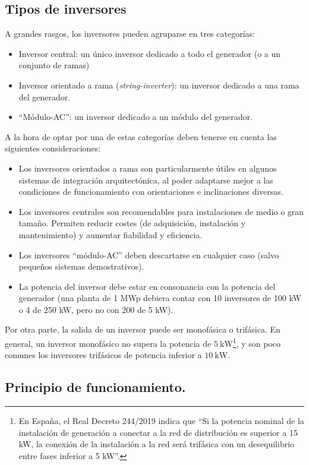 \subsection{Tipos de inversores}

A grandes rasgos, los inversores pueden agruparse en tres categorías:
\begin{itemize}
\item Inversor central: un único inversor dedicado a todo el generador (o
a un conjunto de ramas)
\item Inversor orientado a rama (\emph{string-inverter}): un inversor dedicado
a una rama del generador.
\item {}``Módulo-AC'': un inversor dedicado a un módulo del generador.
\end{itemize}
A la hora de optar por una de estas categorías deben tenerse en cuenta
las siguientes consideraciones:
\begin{itemize}
\item Los inversores orientados a rama son particularmente útiles en algunos
sistemas de integración arquitectónica, al poder adaptarse mejor a
las condiciones de funcionamiento con orientaciones e inclinaciones
diversas.
\item Los inversores centrales son recomendables para instalaciones de medio
o gran tamaño. Permiten reducir costes (de adquisición, instalación
y mantenimiento) y aumentar fiabilidad y eficiencia.
\item Los inversores \textquotedblleft{}módulo-AC\textquotedblright{} deben
descartarse en cualquier caso (salvo pequeños sistemas demostrativos).
\item La potencia del inversor debe estar en consonancia con la potencia
del generador (una planta de 1 MWp debiera contar con 10 inversores
de 100 kW o 4 de 250 kW, pero no con 200 de 5 kW).
\end{itemize}

Por otra parte, la salida de un inversor puede ser monofásica o
trifásica. En general, un inversor monofásico no supera la potencia de
$\SI{5}{\kilo\watt}$\footnote{En España, el Real Decreto 244/2019
  indica que ``Si la potencia nominal de la instalación de generación
  a conectar a la red de distribución es superior a 15 kW, la conexión
  de la instalación a la red será trifásica con un desequilibrio entre
  fases inferior a 5 kW''.}, y son poco comunes los inversores
trifásicos de potencia inferior a $\SI{10}{\kilo\watt}$.

\subsection{Principio de funcionamiento.}

